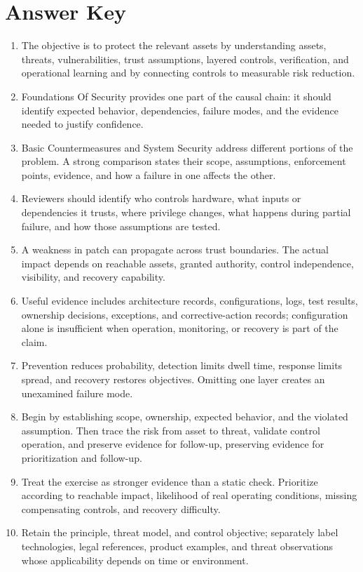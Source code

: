 \documentclass[11pt]{article}
\begin{document}
\section*{Answer Key}
\begin{enumerate}
\item The objective is to protect the relevant assets by understanding assets, threats, vulnerabilities, trust assumptions, layered controls, verification, and operational learning and by connecting controls to measurable risk reduction.
\item Foundations Of Security provides one part of the causal chain: it should identify expected behavior, dependencies, failure modes, and the evidence needed to justify confidence.
\item Basic Countermeasures and System Security address different portions of the problem. A strong comparison states their scope, assumptions, enforcement points, evidence, and how a failure in one affects the other.
\item Reviewers should identify who controls hardware, what inputs or dependencies it trusts, where privilege changes, what happens during partial failure, and how those assumptions are tested.
\item A weakness in patch can propagate across trust boundaries. The actual impact depends on reachable assets, granted authority, control independence, visibility, and recovery capability.
\item Useful evidence includes architecture records, configurations, logs, test results, ownership decisions, exceptions, and corrective-action records; configuration alone is insufficient when operation, monitoring, or recovery is part of the claim.
\item Prevention reduces probability, detection limits dwell time, response limits spread, and recovery restores objectives. Omitting one layer creates an unexamined failure mode.
\item Begin by establishing scope, ownership, expected behavior, and the violated assumption. Then trace the risk from asset to threat, validate control operation, and preserve evidence for follow-up, preserving evidence for prioritization and follow-up.
\item Treat the exercise as stronger evidence than a static check. Prioritize according to reachable impact, likelihood of real operating conditions, missing compensating controls, and recovery difficulty.
\item Retain the principle, threat model, and control objective; separately label technologies, legal references, product examples, and threat observations whose applicability depends on time or environment.
\end{enumerate}
\end{document}
